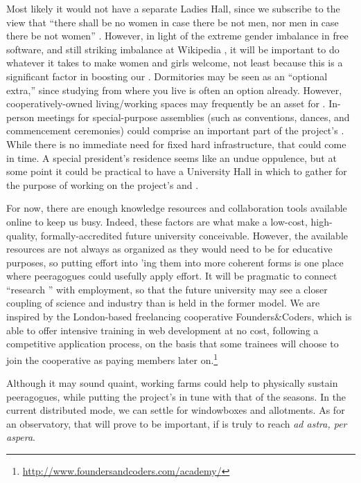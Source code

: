 Most likely it would not have a separate Ladies Hall, since we
subscribe to the view that ``there shall be no women in case there be
not men, nor men in case there be not women'' \cite[Chapter
  1.LII]{rabelais1894gargantua}.  However, in light of the extreme
gender imbalance in free software, and still striking imbalance at
Wikipedia \cite{gender,FM4291}, it will be important to do whatever it
takes to make women and girls welcome, not least because this is a
significant factor in boosting our .
Dormitories may be seen as an ``optional extra,'' since studying from
where you live is often an option already.  However,
cooperatively-owned living/working spaces may frequently be an asset
for .  In-person meetings for
special-purpose assemblies (such as conventions, dances, and
commencement ceremonies) could comprise an important part of the
project's .  While there is no immediate need for
fixed hard infrastructure, that could come in time.  A special
president’s residence seems like an undue oppulence, but at some point
it could be practical to have a University Hall in which to gather for
the purpose of working on the project's  and
.

For now, there are enough knowledge resources and collaboration tools
available online to keep us busy.  Indeed, these factors are what make
a low-cost, high-quality, formally-accredited future university
conceivable.  However, the available resources are not always as
organized as they would need to be for educative purposes, so putting
effort into 'ing them into more
coherent forms is one place where peeragogues could usefully apply
effort.  It will be pragmatic to connect ``research
'' with employment, so that the future
university may see a closer coupling of science and industry than is
held in the former model.  We are inspired by the London-based
freelancing cooperative Founders\&Coders, which is able to offer
intensive training in web development at no cost, following a
competitive application process, on the basis that some trainees will
choose to join the cooperative as paying members later
on.\footnote{\url{http://www.foundersandcoders.com/academy/}}

Although it may sound quaint, working farms could help to physically
sustain peeragogues, while putting the project's
 in tune with that of the seasons.  In the
current distributed mode, we can settle for windowboxes and
allotments.  As for an observatory, that will prove to be important,
if  is truly to reach \emph{ad astra, per
  aspera}.

